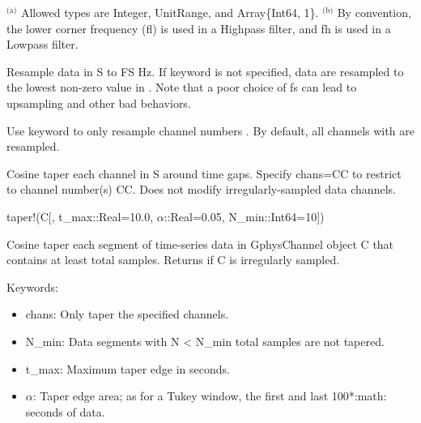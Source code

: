 \documentclass[letterpaper,11pt,english]{sphinxmanual}
\begin{document}
$^{\text{(a)}}$  Allowed types are Integer, UnitRange, and Array\{Int64, 1\}.
$^{\text{(b)}}$  By convention, the lower corner frequency (fl) is used in a Highpass
filter, and fh is used in a Lowpass filter.


\begin{fulllineitems}
\end{fulllineitems}



\begin{fulllineitems}
\end{fulllineitems}


Resample data in S to FS Hz. If keyword  is not specified, data are
resampled to the lowest non-zero value in . Note that a poor choice
of fs can lead to upsampling and other bad behaviors.

Use keyword  to only resample channel numbers . By default,
all channels  with  are resampled.


\begin{fulllineitems}
\end{fulllineitems}


Cosine taper each channel in S around time gaps. Specify chans=CC to restrict
to channel number(s) CC. Does not modify irregularly-sampled data channels.

taper!(C{[}, t\_max::Real=10.0, \(\alpha\)::Real=0.05, N\_min::Int64=10{]})

Cosine taper each segment of time-series data in GphysChannel object C that
contains at least  total samples. Returns if C is irregularly sampled.

Keywords:
\begin{itemize}
\item {} 
chans: Only taper the specified channels.

\item {} 
N\_min: Data segments with N \textless{} N\_min total samples are not tapered.

\item {} 
t\_max: Maximum taper edge in seconds.

\item {} 
\(\alpha\): Taper edge area; as for a Tukey window, the first and last 100*:math: seconds of data.

\end{itemize}
\end{document}
